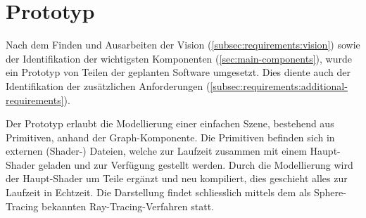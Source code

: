 
\chapter{Prototyp}
\label{chap:prototype}

Nach dem Finden und Ausarbeiten der Vision (\ref{subsec:requirements:vision})
sowie der Identifikation der wichtigsten Komponenten
(\ref{sec:main-components}), wurde ein Prototyp von Teilen der geplanten
Software umgesetzt. Dies diente auch der Identifikation der zusätzlichen
Anforderungen (\ref{subsec:requirements:additional-requirements}).

Der Prototyp erlaubt die Modellierung einer einfachen Szene, bestehend aus
Primitiven, anhand der Graph-Komponente. Die Primitiven befinden sich in
externen (Shader-) Dateien, welche zur Laufzeit zusammen mit einem Haupt-Shader
geladen und zur Verfügung gestellt werden. Durch die Modellierung wird der
Haupt-Shader um Teile ergänzt und neu kompiliert, dies geschieht alles zur
Laufzeit in Echtzeit. Die Darstellung findet schliesslich mittels dem als
Sphere-Tracing bekannten Ray-Tracing-Verfahren statt.






